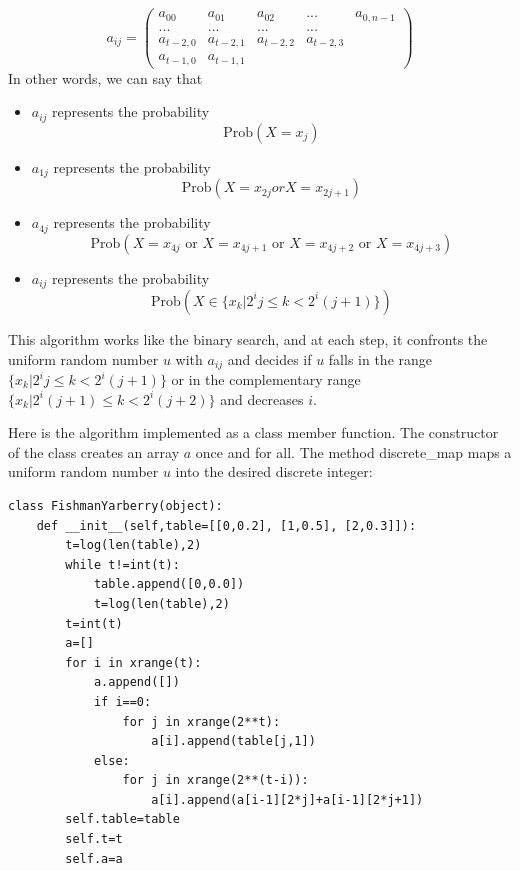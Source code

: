 \documentclass[justified,sixbynine]{tufte-book}
\theoremstyle{plain}%
\theoremstyle{definition}
\theoremstyle{remark}
\begin{document}
\begin{fullwidth}
\begin{equation}
a_{ij}=\left(
\begin{array}{lllll}
a_{00} & a_{01} & a_{02} & ... & a_{0,n-1} \\
... & ... & ... & ... &  \\
a_{t-2,0} & a_{t-2,1} & a_{t-2,2} & a_{t-2,3} &  \\
a_{t-1,0} & a_{t-1,1} &  &  &
\end{array}
\right)
\end{equation}
In other words, we can say that

\begin{itemize}
\item  $a_{ij}$ represents the probability
\begin{equation}
\textrm{Prob}(X=x_j)
\end{equation}

\item  $a_{1j}$ represents the probability
\begin{equation}
\textrm{Prob}(X=x_{2j}orX=x_{2j+1})
\end{equation}

\item  $a_{4j}$ represents the probability
\begin{equation}
\textrm{Prob}(X=x_{4j}\text{ or }X=x_{4j+1}\text{ or }X=x_{4j+2}\text{ or }X=x_{4j+3})
\end{equation}

\item  $a_{ij}$ represents the probability
\begin{equation}
\textrm{Prob}(X\in \{x_k|2^ij\leq k<2^i(j+1)\})
\end{equation}
\end{itemize}

This algorithm works like the binary search, and at each step, it confronts the
uniform random number $u$ with $a_{ij}$ and decides if $u$ falls in the
range $\{x_k|2^ij\leq k<2^i(j+1)\}$ or in the complementary range $%
\{x_k|2^i(j+1)\leq k<2^i(j+2)\}$ and decreases $i.$

Here is the algorithm implemented as a class member function. The
constructor of the class creates an array $a$ once and for all. The method
discrete\_map maps a uniform random number $u$ into the desired discrete
integer:


\begin{lstlisting}
class FishmanYarberry(object):
    def __init__(self,table=[[0,0.2], [1,0.5], [2,0.3]]):
        t=log(len(table),2)
        while t!=int(t):
            table.append([0,0.0])
            t=log(len(table),2)
        t=int(t)
        a=[]
        for i in xrange(t):
            a.append([])
            if i==0:
                for j in xrange(2**t):
                    a[i].append(table[j,1])
            else:
                for j in xrange(2**(t-i)):
                    a[i].append(a[i-1][2*j]+a[i-1][2*j+1])
        self.table=table
        self.t=t
        self.a=a


\end{lstlisting}
\end{fullwidth}
\end{document}
